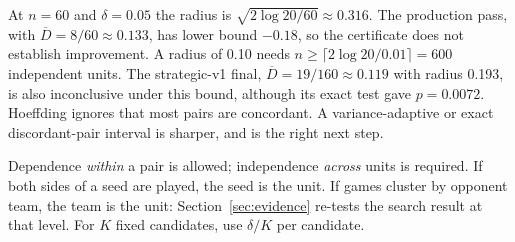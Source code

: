 \begin{example}
At $n=60$ and $\delta=0.05$ the radius is $\sqrt{2\log20/60}\approx0.316$. The
production pass, with $\overline D=8/60\approx0.133$, has lower bound $-0.18$,
so the certificate does not establish improvement. A radius of 0.10 needs
$n\ge\lceil2\log20/0.01\rceil=600$ independent units. The strategic-v1 final,
$\overline D=19/160\approx0.119$ with radius 0.193, is also inconclusive under
this bound, although its exact test gave $p=0.0072$. Hoeffding ignores that
most pairs are concordant. A variance-adaptive or exact
discordant-pair interval is sharper, and is the right next step.
\end{example}

Dependence \emph{within} a pair is allowed; independence \emph{across} units is
required. If both sides of a seed are played, the seed is the unit. If games
cluster by opponent team, the team is the unit: Section~\ref{sec:evidence}
re-tests the search result at that level. For $K$ fixed candidates, use
$\delta/K$ per candidate.

